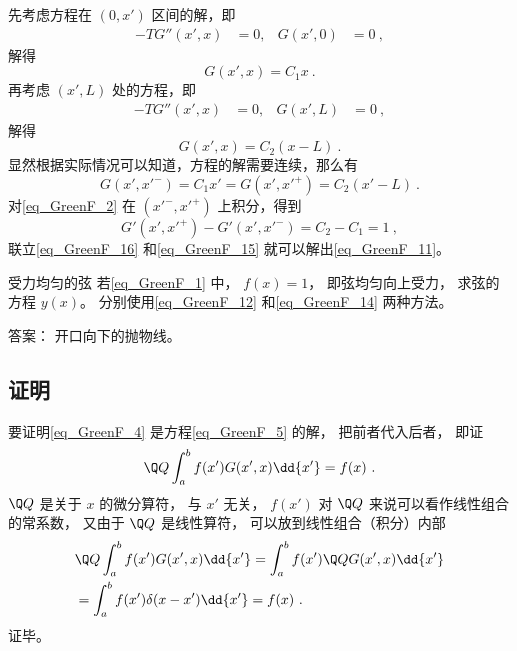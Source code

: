 先考虑方程在 $(0,x')$ 区间的解，即
\begin{align}
-TG''(x',x) &=0,&
G(x',0)&=0~,
\end{align}
解得
\begin{equation}
G(x',x)=C_1 x~.
\end{equation}
再考虑 $(x',L)$ 处的方程，即
\begin{align}
-TG''(x',x) &= 0,&
G(x',L) &= 0~,
\end{align}
解得
\begin{equation}
G(x',x) = C_2 (x-L)~.
\end{equation}
显然根据实际情况可以知道，方程的解需要连续，那么有
\begin{equation}
G(x',x'^-) = C_1x' = G(x',x'^+) = C_2 (x'-L)
\label{eq_GreenF_16}~.
\end{equation}
对\autoref{eq_GreenF_2} 在 $(x'^-,x'^+)$ 上积分，得到
\begin{equation}
G'(x',x'^+)-G'(x',x'^-)=C_2-C_1=1
\label{eq_GreenF_15}~,
\end{equation}
联立\autoref{eq_GreenF_16} 和\autoref{eq_GreenF_15} 就可以解出\autoref{eq_GreenF_11}。


\begin{exercise}{受力均匀的弦}
若\autoref{eq_GreenF_1} 中， $f(x) = 1$， 即弦均匀向上受力， 求弦的方程 $y(x)$。 分别使用\autoref{eq_GreenF_12} 和\autoref{eq_GreenF_14} 两种方法。

答案： 开口向下的抛物线。
\end{exercise}

\subsection{证明}
要证明\autoref{eq_GreenF_4} 是方程\autoref{eq_GreenF_5} 的解， 把前者代入后者， 即证
\begin{equation}
\Q Q \int_a^b f(x') G(x', x) \dd{x'} = f(x)~.
\end{equation}
$\Q Q$ 是关于 $x$ 的微分算符， 与 $x'$ 无关， $f(x')$ 对 $\Q Q$ 来说可以看作线性组合的常系数， 又由于 $\Q Q$ 是线性算符， 可以放到线性组合（积分）内部
\begin{equation}\label{eq_GreenF_6}
\begin{aligned}
&\Q Q \int_a^b f(x') G(x', x) \dd{x'} = \int_a^b f(x') \Q QG(x', x)\dd{x'}\\
&= \int_a^b f(x') \delta(x - x') \dd{x'} = f(x)~.
\end{aligned}
\end{equation}
证毕。

